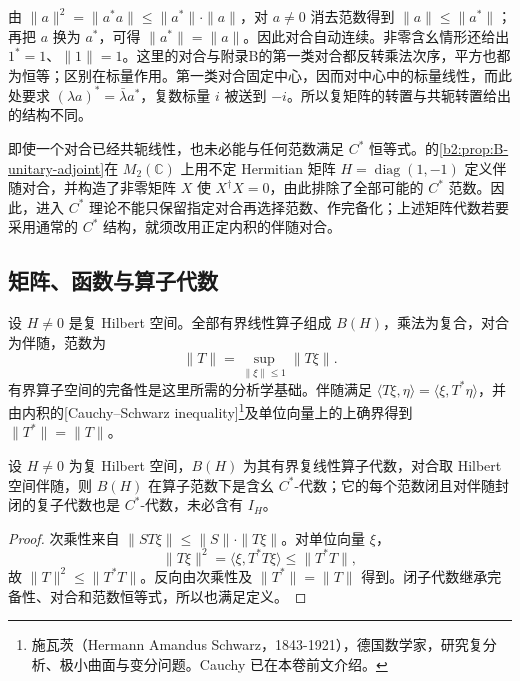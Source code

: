 由 \(\|a\|^2=\|a^*a\|\le\|a^*\|\cdot\|a\|\)，对 \(a\ne0\) 消去范数得到 \(\|a\|\le\|a^*\|\)；再把 \(a\) 换为 \(a^*\)，可得 \(\|a^*\|=\|a\|\)。因此对合自动连续。非零含幺情形还给出 \(1^*=1\)、\(\|1\|=1\)。这里的对合与附录B的第一类对合都反转乘法次序，平方也都为恒等；区别在标量作用。第一类对合固定中心，因而对中心中的标量线性，而此处要求 \((\lambda a)^*=\bar\lambda a^*\)，复数标量 \(i\) 被送到 \(-i\)。所以复矩阵的转置与共轭转置给出的结构不同。

\ProseParagraphBreak
即使一个对合已经共轭线性，也未必能与任何范数满足 \(C^*\) 恒等式。的\cref{b2:prop:B-unitary-adjoint}在 \(M_2(\mathbb C)\) 上用不定 Hermitian 矩阵 \(H=\operatorname{diag}(1,-1)\) 定义伴随对合，并构造了非零矩阵 \(X\) 使 \(X^\dagger X=0\)，由此排除了全部可能的 \(C^*\) 范数。因此，进入 \(C^*\) 理论不能只保留指定对合再选择范数、作完备化；上述矩阵代数若要采用通常的 \(C^*\) 结构，就须改用正定内积的伴随对合。

\subsection{矩阵、函数与算子代数}
\label{b2:subsec:D01:02}

设 \(H\ne0\) 是复 Hilbert 空间。全部有界线性算子组成 \(B(H)\)，乘法为复合，对合为伴随，范数为
\[
	\|T\|=\sup_{\|\xi\|\le1}\|T\xi\|.
\]
有界算子空间的完备性是这里所需的分析学基础。伴随满足 \(\langle T\xi,\eta\rangle=\langle\xi,T^*\eta\rangle\)，并由内积的[Cauchy--Schwarz inequality]\footnote{施瓦茨（Hermann Amandus Schwarz，1843-1921），德国数学家，研究复分析、极小曲面与变分问题。Cauchy 已在本卷前文介绍。}及单位向量上的上确界得到 \(\|T^*\|=\|T\|\)。

\begin{proposition}\label{b2:prop:operator-cstar}
	设 \(H\ne0\) 为复 Hilbert 空间，\(B(H)\) 为其有界复线性算子代数，对合取 Hilbert 空间伴随，则 \(B(H)\) 在算子范数下是含幺 \(C^*\)-代数；它的每个范数闭且对伴随封闭的复子代数也是 \(C^*\)-代数，未必含有 \(I_H\)。
\end{proposition}
\begin{proof}
	次乘性来自 \(\|ST\xi\|\le\|S\|\cdot\|T\xi\|\)。对单位向量 \(\xi\)，
	\[
		\|T\xi\|^2=\langle\xi,T^*T\xi\rangle\le\|T^*T\|,
	\]
	故 \(\|T\|^2\le\|T^*T\|\)。反向由次乘性及 \(\|T^*\|=\|T\|\) 得到。闭子代数继承完备性、对合和范数恒等式，所以也满足定义。
\end{proof}

